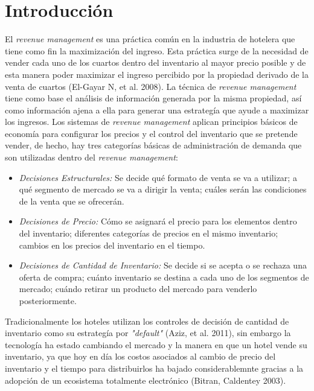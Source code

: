 \chapter{Introducción}
\label{ch:intro}
El \emph{revenue management} es una práctica común en la industria de hotelera que tiene como fin la maximización del ingreso. Esta práctica surge de la necesidad de vender cada uno de los cuartos dentro del inventario al mayor precio posible y de esta manera poder maximizar el ingreso percibido por la propiedad derivado de la venta de cuartos (El-Gayar N, et al. 2008).
La técnica de \emph{revenue management} tiene como base el análisis de información generada por la misma propiedad, así como información ajena a ella para generar una estrategía que ayude a maximizar los ingresos.
Los sistemas de \emph{revenue management} aplican principios básicos de economía para configurar los precios y el control del inventario que se pretende vender, de hecho, hay tres categorías básicas de administración de demanda que son utilizadas dentro del \emph{revenue management}:
\begin{itemize}
  \item \emph{Decisiones Estructurales:} Se decide qué formato de venta se va a utilizar; a qué segmento de mercado se va a dirigir la venta; cuáles serán las condiciones de la venta que se ofrecerán.
  \item \emph{Decisiones de Precio:} Cómo se asignará el precio para los elementos dentro del inventario; diferentes categorías de precios en el mismo inventario;  cambios en los precios del inventario en el tiempo.
  \item \emph{Decisiones de Cantidad de Inventario:} Se decide si se acepta o se rechaza una oferta de compra; cuánto inventario se destina a cada uno de los segmentos de mercado; cuándo retirar un producto del mercado para venderlo posteriormente.
\end{itemize}
Tradicionalmente los hoteles utilizan los controles de decisión de cantidad de inventario como su estrategía por \emph{"default"} (Aziz, et al. 2011), sin embargo la tecnología ha estado cambiando el mercado y la manera en que un hotel vende su inventario, ya que hoy en día los costos asociados al cambio de precio del inventario y el tiempo para distribuirlos ha bajado considerablemnte gracias a la adopción de un ecosistema totalmente electrónico (Bitran, Caldentey 2003).
